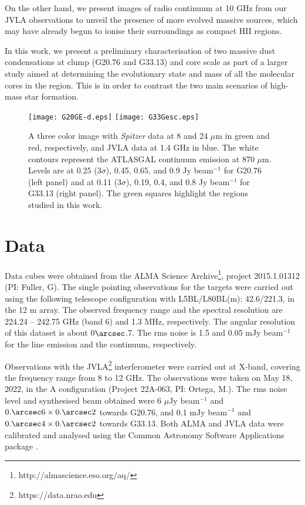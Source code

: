 \documentclass[baaa]{baaa}
\begin{document}
On the other hand, we present images of radio continuum at 10 GHz from our JVLA observations to unveil the presence of more evolved massive sources, which may have already begun to ionise their surroundings as compact HII regions.


In this work, we present a preliminary characterisation of two massive dust condensations at clump (G20.76 and G33.13) and core scale as part of a larger study aimed at determining the evolutionary state and mass of all the molecular cores in the region. This is in order to contrast the two main scenarios of high-mass star formation.



\begin{figure*} [!t]
\centering
\texttt{[image: G20GE-d.eps]}
\texttt{[image: G33Gesc.eps]}
\caption{ A three color image with \textit{Spitzer} data at 8 and  24 $\mu$m in green and red, respectively, and JVLA data at 1.4 GHz in blue. The white contours represent the ATLASGAL continuum emission at 870 $\mu$m. Levels are at 0.25 (3$\sigma$), 0.45, 0.65, and 0.9 Jy beam$^{-1}$ for G20.76 (left panel) and  at 0.11 (3$\sigma$), 0.19, 0.4, and 0.8 Jy beam$^{-1}$ for G33.13 (right panel). The green squares highlight the regions studied in this work.}
\label{Gescala}
\end{figure*}


\section{Data}

Data cubes were obtained from the ALMA Science Archive\footnote{http://almascience.eso.org/aq/}, project 2015.1.01312 (PI: Fuller, G). The single pointing observations for the targets were carried out using the following telescope configuration with L5BL/L80BL(m): 42.6/221.3, in the 12 m array. The observed frequency range and the spectral resolution are 224.24 – 242.75 GHz (band 6) and 1.3 MHz, respectively. The angular resolution of this dataset is about 0$\arcsec$.7. The rms noise is 1.5 and 0.05 mJy beam$^{-1}$ for the line emission and the continuum, respectively. 

Observations with the JVLA\footnote{https://data.nrao.edu} interferometer were carried out at X-band, covering the frequency range from 8 to 12 GHz. The observations were taken on May 18, 2022, in the A configuration (Project 22A-063, PI: Ortega, M.). The rms noise level and synthesised beam obtained were 6 $\mu$Jy beam$^{-1}$ and $0.\arcsec6 \times 0.\arcsec2$ towards G20.76, and 0.1 mJy beam$^{-1}$ and $0.\arcsec4 \times 0.\arcsec2$ towards G33.13. Both ALMA and JVLA data were calibrated and analysed using the Common Astronomy Software Applications package \citep[CASA,][version 4.7.2]{McMullin2007}. 
\end{document}
